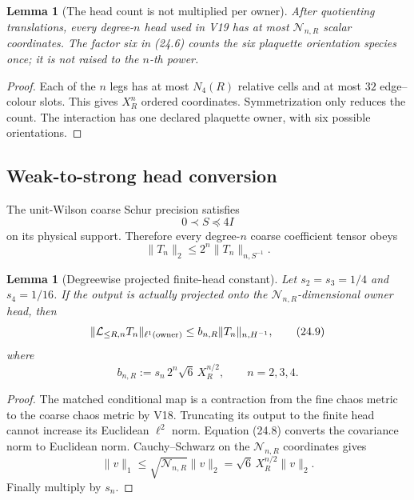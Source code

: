 \documentclass[11pt,oneside]{book}
\newtheorem{lemma}[theorem]{Lemma}
\theoremstyle{definition}
\theoremstyle{remark}
\begin{document}
\begin{lemma}[The head count is not multiplied per owner]
\label{lem:e8v24-owner-count}
After quotienting translations, every degree-\(n\) head used in V19
has at most \(\mathcal N_{n,R}\) scalar coordinates.  The factor six
in (24.6) counts the six plaquette orientation species once; it is not
raised to the \(n\)-th power.
\end{lemma}

\begin{proof}
Each of the \(n\) legs has at most \(N_4(R)\) relative cells and at
most \(32\) edge--colour slots.  This gives \(X_R^n\) ordered
coordinates.  Symmetrization only reduces the count.  The interaction
has one declared plaquette owner, with six possible orientations.
\end{proof}

\subsection{Weak-to-strong head conversion}

The unit-Wilson coarse Schur precision satisfies
\[
                         0\prec S\preceq4I                         \tag{24.7}
\]
on its physical support.  Therefore every degree-\(n\) coarse
coefficient tensor obeys
\[
                         \|T_n\|_2\leq2^n\|T_n\|_{n,S^{-1}}.       \tag{24.8}
\]

\begin{lemma}[Degreewise projected finite-head constant]
\label{lem:e8v24-degree-head}
Let \(s_2=s_3=1/4\) and \(s_4=1/16\).  If the output is actually
projected onto the \(\mathcal N_{n,R}\)-dimensional owner head, then
\[
\|\mathcal L_{\leq R,n}T_n\|_{\ell^1({\rm owner})}
\leq b_{n,R}\|T_n\|_{n,H^{-1}},                   \tag{24.9}
\]
where
\[
\boxed{\qquad
b_{n,R}:=s_n\,2^n\sqrt6\,X_R^{n/2},
\qquad n=2,3,4.
\qquad}                                            \tag{24.10}
\]
\end{lemma}

\begin{proof}
The matched conditional map is a contraction from the fine chaos
metric to the coarse chaos metric by V18.  Truncating its output to
the finite head cannot increase its Euclidean \(\ell^2\) norm.
Equation (24.8) converts the covariance norm to Euclidean norm.
Cauchy--Schwarz on the \(\mathcal N_{n,R}\) coordinates gives
\[
\|v\|_1\leq\sqrt{\mathcal N_{n,R}}\|v\|_2
=\sqrt6\,X_R^{n/2}\|v\|_2.
\]
Finally multiply by \(s_n\).
\end{proof}
\end{document}
